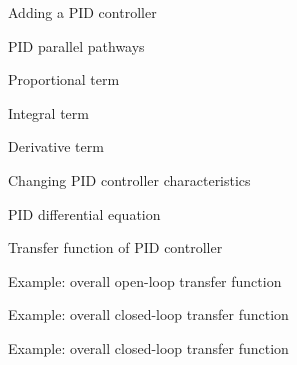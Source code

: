 \documentclass[compress]{beamer}
\begin{document}
{
    \begin{frame}{Adding a PID controller}
    \end{frame}
}

{
    \begin{frame}{PID parallel pathways}
    \end{frame}
}

{
    \begin{frame}{Proportional term}
    \end{frame}
}

{
    \begin{frame}{Integral term}
    \end{frame}
}

{
    \begin{frame}{Derivative term}
    \end{frame}
}

{
    \begin{frame}{Changing PID controller characteristics}
    \end{frame}
}

{
    \begin{frame}{PID differential equation}
    \end{frame}
}

{
    \begin{frame}{Transfer function of PID controller}
    \end{frame}
}

{
    \begin{frame}{Example: overall open-loop transfer function}
    \end{frame}
}

{
    \begin{frame}{Example: overall closed-loop transfer function}
    \end{frame}
}


{
    \begin{frame}{Example: overall closed-loop transfer function}
    \end{frame}
}
\end{document}
